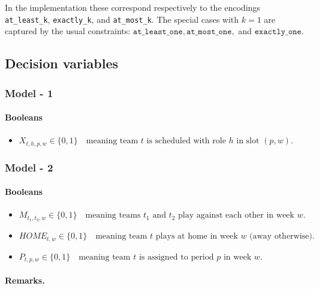 \documentclass{article}
\begin{document}
In the implementation these correspond respectively to the encodings 
\texttt{at\_least\_k}, \texttt{exactly\_k}, and \texttt{at\_most\_k}. The special cases with $k=1$ are captured by the usual constraints:
$ \texttt{at\_least\_one}, 
\texttt{at\_most\_one}, $ and $ 
\texttt{exactly\_one}.
$


\subsection{Decision variables}

\subsubsection{Model - 1}

\paragraph{Booleans}

\begin{itemize}
    \item  $ X_{t,h,p,w}\in\{0,1\} \quad\text{meaning team }t\text{ is scheduled with role }h\text{ in slot }(p,w). $
\end{itemize}

\subsubsection{Model - 2}

\paragraph{Booleans}

\begin{itemize}
    \item  $ M_{t_1,t_2,w} \in \{0,1\} \quad\text{meaning teams $t_1$ and $t_2$ play against each other in week $w$}. $
    \item $HOME_{t,w} \in \{0,1\} \quad\text{meaning team $t$ plays at home in week $w$ (away otherwise)}.$
    \item $P_{t,p,w} \in \{0,1\} \quad\text{meaning team $t$ is assigned to period $p$ in week $w$}.$
\end{itemize}


\paragraph{Remarks.}
\end{document}
